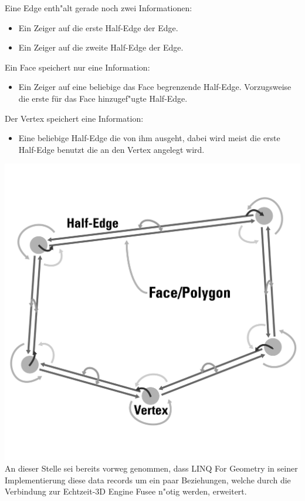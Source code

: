 \documentclass[pagesize, paper=a4, fontsize=12pt,titlepage=true, headings=small, headnosepline, abstractoff, liststotoc, nochapterprefix, plainheadsepline]{scrreprt}
\newcommand{\LFGS}{LINQ For Geometry }
\begin{document}
Eine Edge enth"alt gerade noch zwei Informationen:
\begin{itemize}
\item Ein Zeiger auf die erste Half-Edge der Edge.
\item Ein Zeiger auf die zweite Half-Edge der Edge.
\end{itemize}

Ein Face speichert nur eine Information:
\begin{itemize}
\item Ein Zeiger auf eine beliebige das Face begrenzende Half-Edge. Vorzugsweise die erste für das Face hinzugef"ugte Half-Edge.
\end{itemize}

Der Vertex speichert eine Information:
\begin{itemize}
\item Eine beliebige Half-Edge die von ihm ausgeht, dabei wird meist die erste Half-Edge benutzt die an den Vertex angelegt wird.
\end{itemize}

\includegraphics[width=\linewidth]{../Bilder/hesBeziehungen}
\label{pic:polyConnections} 
\vspace{15mm}
An dieser Stelle sei bereits vorweg genommen, dass \LFGS in seiner Implementierung diese data records um ein paar Beziehungen, welche durch die Verbindung zur Echtzeit-3D Engine Fusee n"otig werden, erweitert.
\end{document}
